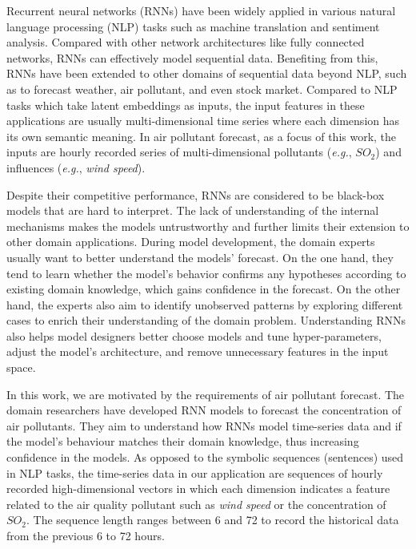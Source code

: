 \label{section:introduction}
Recurrent neural networks (RNNs) have been widely applied in various natural language processing (NLP) tasks such as machine translation and sentiment analysis. 
Compared with other network architectures like fully connected networks, RNNs can effectively model sequential data.
Benefiting from this, RNNs have been extended to other domains of sequential data beyond NLP, such as to forecast weather\cite{xingjian2015convolutional, cao2012forecasting, shi2017deep}, air pollutant\cite{oprea2016neural, zhou2017prediction, li2017long}, and even stock market\cite{kim2018forecasting,nelson2017stock,akita2016deep}.
Compared to NLP tasks which take latent embeddings as inputs, the input features in these applications are usually multi-dimensional time series where each dimension has its own semantic meaning.
In air pollutant forecast, as a focus of this work, the inputs are hourly recorded series of multi-dimensional pollutants (\emph{e.g.}, $SO_{2}$) and influences (\emph{e.g.}, \textit{wind speed}).

Despite their competitive performance, RNNs are considered to be black-box models that are hard to interpret.
The lack of understanding of the internal mechanisms makes the models untrustworthy and further limits their extension to other domain applications. 
During model development, the domain experts usually want to better understand the models' forecast.
On the one hand, they tend to learn whether the model's behavior confirms any hypotheses according to existing domain knowledge, which gains confidence in the forecast.
On the other hand, the experts also aim to identify unobserved patterns by exploring different cases to enrich their understanding of the domain problem.
Understanding RNNs also helps model designers better choose models and tune hyper-parameters, adjust the model's architecture, and remove unnecessary features in the input space.

In this work, we are motivated by the requirements of air pollutant forecast. 
The domain researchers have developed RNN models to forecast the concentration of air pollutants.
They aim to understand how RNNs model time-series data and if the model's behaviour matches their domain knowledge, thus increasing confidence in the models. 
As opposed to the symbolic sequences (sentences) used in NLP tasks, the time-series data in our application are sequences of hourly recorded high-dimensional vectors in which each dimension indicates a feature related to the air quality pollutant such as \textit{wind speed} or   
the concentration of $SO_{2}$.
The sequence length ranges between 6 and 72 to record the historical data from the previous 6 to 72 hours.


